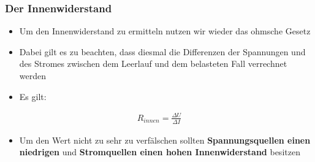 \begin{frame}
  \frametitle{Der Innenwiderstand}
  \begin{itemize}
    \item Um den Innenwiderstand zu ermitteln nutzen wir wieder das ohmsche Gesetz
    \item Dabei gilt es zu beachten, dass diesmal die Differenzen der Spannungen und des Stromes zwischen dem Leerlauf und dem belasteten Fall verrechnet werden
    \item Es gilt:
  \end{itemize}
  \begin{align}
    R_{innen} = \frac{\Delta U}{\Delta I}
  \end{align}
  \begin{itemize}
    \item Um den Wert nicht zu sehr zu verfälschen sollten \textbf{Spannungsquellen einen niedrigen} und \textbf{Stromquellen einen hohen Innenwiderstand} besitzen
  \end{itemize}
\end{frame}



